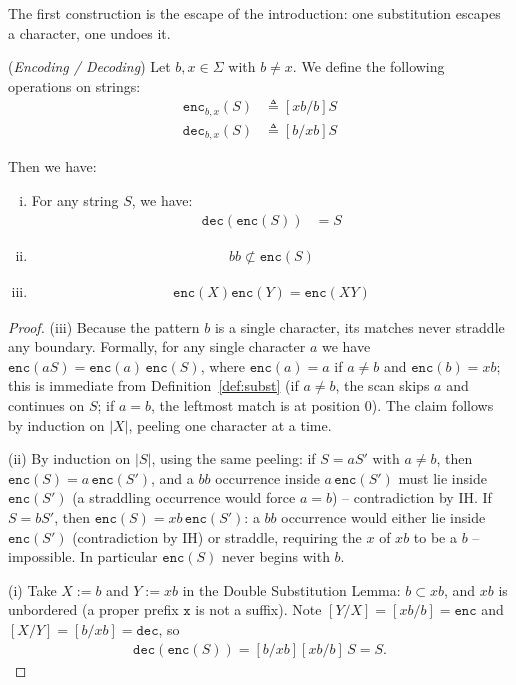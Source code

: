 \documentclass[runningheads,envcountsect]{llncs}
\begin{document}
The first construction is the escape of the introduction: one substitution escapes a character, one undoes it.

\begin{theorem}
    (\emph{Encoding / Decoding})
    \label{thm:enc}
    Let $b, x \in \Sigma$ with $b \neq x$. We define the following operations on strings:
    \begin{align}
        \mathtt{enc}_{b,x}(S) & \triangleq [xb/b]S \\
        \mathtt{dec}_{b,x}(S) & \triangleq [b/xb]S
    \end{align}

    Then we have:
    \begin{enumerate}[(i)]
        \item For any string $S$, we have:
              \begin{align}
                  \mathtt{dec}(\mathtt{enc}(S)) & =S
              \end{align}
        \item \begin{align}
                  bb \not\subset \mathtt{enc}(S)
              \end{align}
        \item \begin{align}
                  \mathtt{enc}(X)\mathtt{enc}(Y) = \mathtt{enc}(XY)
              \end{align}
    \end{enumerate}
\end{theorem}

\begin{proof}
    (iii) Because the pattern $b$ is a single character, its matches never straddle any boundary. Formally, for any single character $a$ we have $\mathtt{enc}(aS) = \mathtt{enc}(a)\,\mathtt{enc}(S)$, where $\mathtt{enc}(a) = a$ if $a \neq b$ and $\mathtt{enc}(b) = xb$; this is immediate from Definition~\ref{def:subst} (if $a\neq b$, the scan skips $a$ and continues on $S$; if $a = b$, the leftmost match is at position $0$). The claim follows by induction on $|X|$, peeling one character at a time.

    (ii) By induction on $|S|$, using the same peeling: if $S = aS'$ with $a\neq b$, then $\mathtt{enc}(S) = a\,\mathtt{enc}(S')$, and a $bb$ occurrence inside $a\,\mathtt{enc}(S')$ must lie inside $\mathtt{enc}(S')$ (a straddling occurrence would force $a = b$) -- contradiction by IH. If $S = bS'$, then $\mathtt{enc}(S) = xb\,\mathtt{enc}(S')$: a $bb$ occurrence would either lie inside $\mathtt{enc}(S')$ (contradiction by IH) or straddle, requiring the $x$ of $xb$ to be a $b$ -- impossible. In particular $\mathtt{enc}(S)$ never begins with $b$.

    (i) Take $X := b$ and $Y := xb$ in the Double Substitution Lemma: $b \subset xb$, and $xb$ is unbordered (a proper prefix $\mathtt{x}$ is not a suffix). Note $[Y/X] = [xb/b] = \mathtt{enc}$ and $[X/Y] = [b/xb] = \mathtt{dec}$, so
    \begin{align}
        \mathtt{dec}(\mathtt{enc}(S)) = [b/xb][xb/b]\,S = S.
    \end{align}
\end{proof}
\end{document}
